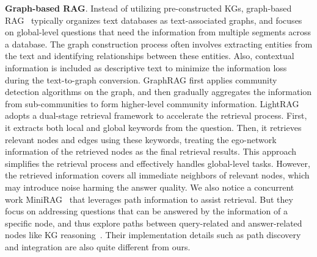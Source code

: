 \textbf{Graph-based RAG}. Instead of utilizing pre-constructed KGs,
graph-based RAG~\cite{edge2024graphrag,guo2024lightrag} typically organizes text databases as text-associated graphs, and focuses on global-level questions that need the information from multiple segments across a database. The graph construction process often involves extracting entities from the text and identifying relationships between these entities. Also, contextual information is included as descriptive text to minimize the information loss during the text-to-graph conversion. GraphRAG \cite{edge2024graphrag} first applies community detection algorithms on the graph, and then gradually aggregates the information from sub-communities to form higher-level community information. LightRAG \cite{guo2024lightrag} adopts a dual-stage retrieval framework to accelerate the retrieval process. First, it extracts both local and global keywords from the question. Then, it retrieves relevant nodes and edges using these keywords, treating the ego-network information of the retrieved nodes as the final retrieval results. This approach simplifies the retrieval process and effectively handles global-level tasks. However, the retrieved information covers all immediate neighbors of relevant nodes, which may introduce noise harming the answer quality. We also notice a concurrent work MiniRAG~\cite{fan2025minirag} that leverages path information to assist retrieval. But they focus on addressing questions that can be answered by the information of a specific node, and thus explore paths between query-related and answer-related nodes like KG reasoning~\cite{yasunaga2021kg-rag,liu2021kg,tian2022knowledge}. Their implementation details such as path discovery and integration are also quite different from ours.